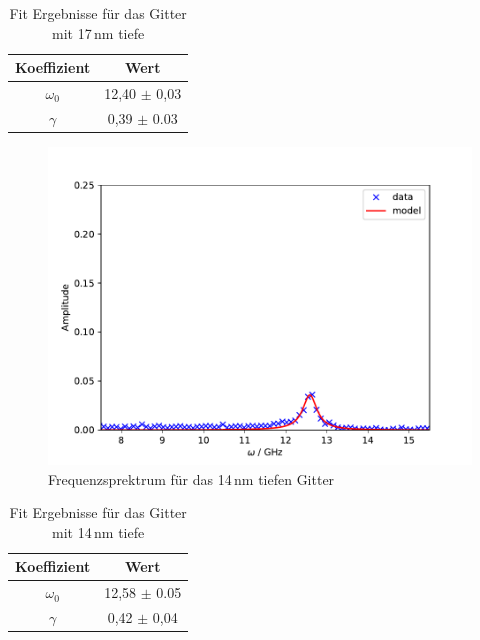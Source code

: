 \begin{table}[h!]
 \centering
\begin{tabular}{cc}
    Koeffizient & Wert \\
	\midrule
 	$\omega_0$ & 12,40 $\pm$ 0,03 \\
 	$\gamma$ & 0,39 $\pm$ 0.03 \\
\end{tabular}
\caption{Fit Ergebnisse für das Gitter mit 17\,nm tiefe}
\label{tab:fit}
\end{table}

\begin{figure}[h!]
 	\centering
 	\includegraphics[width=\textwidth]{img/007_a000_b0_e245_G2fft.pdf}
 	\caption{Frequenzsprektrum für das 14\,nm tiefen Gitter}
 	\label{abb:film}
\end{figure}

\begin{table}[h!]
 \centering
\begin{tabular}{cc}
    Koeffizient & Wert \\
	\midrule
 	$\omega_0$ & 12,58 $\pm$ 0.05 \\
 	$\gamma$ & 0,42 $\pm$ 0,04 \\
\end{tabular}
\caption{Fit Ergebnisse für das Gitter mit 14\,nm tiefe}
\label{tab:fit}
\end{table}

